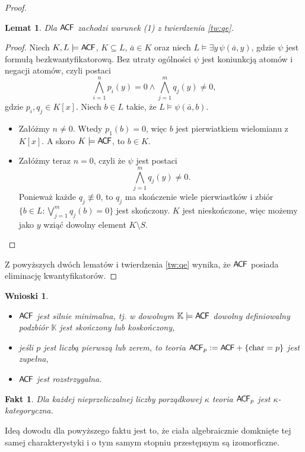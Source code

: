 \documentclass{article}
\theoremstyle{plain}
\newtheorem{wnn}[thm]{Wnioski}
\newtheorem{lem}[thm]{Lemat}
\newtheorem{fakt}[thm]{Fakt}
\theoremstyle{definition}
\theoremstyle{remark}
\newcommand{\ACF}{\mathsf{A \mkern-2.0mu C \mkern-1.1mu F}}
\begin{document}
\begin{proof}
\begin{lem}
	Dla $\ACF$ zachodzi warunek (1) z twierdzenia \ref{tw:qe}.
\end{lem}
\begin{proof}
	Niech $K, L \models \ACF$, $K \subseteq L$, $\bar{a} \in K$ oraz
	niech $L \models \exists y \, \psi(\bar{a}, y)$, gdzie $\psi$ jest formułą
	bezkwantyfikatorową. Bez utraty ogólności $\psi$ jest koniunkcją
	atomów i negacji atomów, czyli postaci
	\[
		\bigwedge_{i = 1}^n p_i(y) = 0 \wedge
		\bigwedge_{j = 1}^m q_j(y) \not= 0,
	\]
	gdzie $p_i, q_j \in K[x]$.
	Niech $b \in L$ takie, że $L \models \psi(\bar{a}, b)$.
	\begin{itemize}
		\item Załóżmy $n \not= 0$. Wtedy $p_1(b) = 0$, więc $b$ jest
			pierwiatkiem wielomianu z $K[x]$.
			A skoro $K \models \ACF$, to $b \in K$.
		\item Załóżmy teraz $n = 0$, czyli że $\psi$ jest postaci
	\[
		\bigwedge_{j = 1}^m q_j(y) \not= 0.
	\]
	Ponieważ każde $q_j \not\equiv 0$, to $q_j$ ma skończenie wiele
			pierwiastków i zbiór
			$\{b \in L \colon \bigvee_{j = 1}^m q_j(b) = 0\}$
			jest skończony. $K$ jest nieskończone, więc możemy jako
			$y$ wziąć dowolny element $K \setminus S$.
	\end{itemize}
\end{proof}
Z powyższych dwóch lematów i twierdzenia \ref{tw:qe} wynika, że $\ACF$ posiada
eliminację kwantyfikatorów.
\end{proof}

\begin{wnn}
	~\begin{itemize}
		\item $\ACF$ jest silnie minimalna, tj. w dowolnym $\mathbb{K}
			\models \ACF$ dowolny definiowalny podzbiór
			$\mathbb{K}$ jest skończony lub koskończony,
		\item jeśli $p$ jest liczbą pierwszą lub zerem, to teoria
			$\ACF_p := \ACF + \{\text{char} = p\}$ jest zupełna,
		\item $\ACF$ jest rozstrzygalna.
	\end{itemize}
\end{wnn}

\begin{fakt}
	Dla każdej nieprzeliczalnej liczby porządkowej $\kappa$ teoria $\ACF_p$
	jest $\kappa$-kategoryczna.
\end{fakt}
Ideą dowodu dla powyższego faktu jest to, że ciała algebraicznie domknięte tej
samej charakterystyki i o tym samym stopniu przestępnym są izomorficzne.
\end{document}
